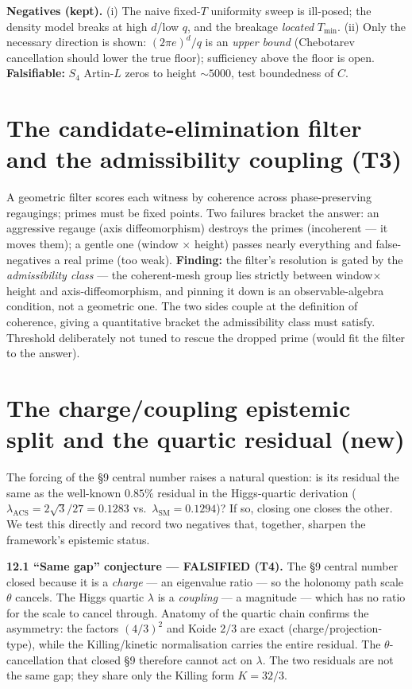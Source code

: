 \documentclass[11pt]{article}
\begin{document}
\textbf{Negatives (kept).} (i) The naive fixed-$T$ uniformity sweep is ill-posed; the density model breaks at high $d$/low $q$, and the breakage \emph{located} $T_{\min}$. (ii) Only the necessary direction is shown: $(2\pi e)^d/q$ is an \emph{upper bound} (Chebotarev cancellation should lower the true floor); sufficiency above the floor is open. \textbf{Falsifiable:} $S_4$ Artin-$L$ zeros to height $\sim5000$, test boundedness of $C$.

\section{The candidate-elimination filter and the admissibility coupling (T3)}

A geometric filter scores each witness by coherence across phase-preserving regaugings; primes must be fixed points. Two failures bracket the answer: an aggressive regauge (axis diffeomorphism) destroys the primes (incoherent --- it moves them); a gentle one (window $\times$ height) passes nearly everything and false-negatives a real prime (too weak). \textbf{Finding:} the filter's resolution is gated by the \emph{admissibility class} --- the coherent-mesh group lies strictly between window$\times$height and axis-diffeomorphism, and pinning it down is an observable-algebra condition, not a geometric one. The two sides couple at the definition of coherence, giving a quantitative bracket the admissibility class must satisfy. Threshold deliberately not tuned to rescue the dropped prime (would fit the filter to the answer).

\section{The charge/coupling epistemic split and the quartic residual (new)}

The forcing of the \S9 central number raises a natural question: is its residual the same as the well-known $0.85\%$ residual in the Higgs-quartic derivation ($\lambda_{\text{ACS}}=2\sqrt3/27=0.1283$ vs.\ $\lambda_{\text{SM}}=0.1294$)? If so, closing one closes the other. We test this directly and record two negatives that, together, sharpen the framework's epistemic status.

\textbf{12.1 ``Same gap'' conjecture --- FALSIFIED (T4).} The \S9 central number closed because it is a \emph{charge} --- an eigenvalue ratio --- so the holonomy path scale $\theta$ cancels. The Higgs quartic $\lambda$ is a \emph{coupling} --- a magnitude --- which has no ratio for the scale to cancel through. Anatomy of the quartic chain confirms the asymmetry: the factors $(4/3)^2$ and Koide $2/3$ are exact (charge/projection-type), while the Killing/kinetic normalisation carries the entire residual. The $\theta$-cancellation that closed \S9 therefore cannot act on $\lambda$. The two residuals are not the same gap; they share only the Killing form $K=32/3$.
\end{document}
